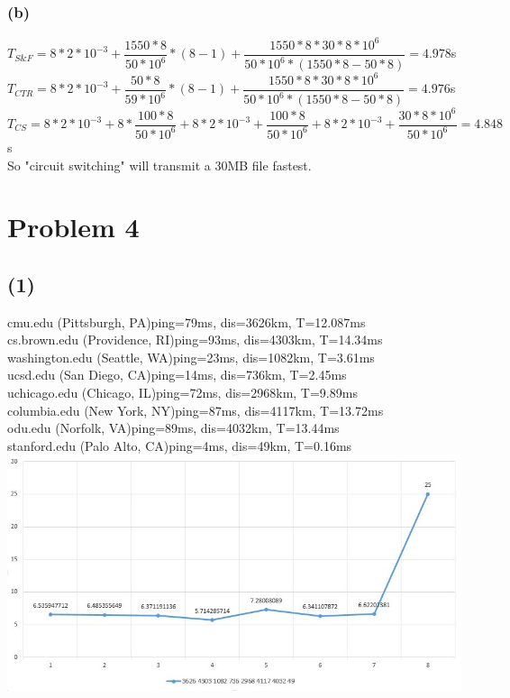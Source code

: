 \documentclass[11pt]{article}
\begin{document}
\subsubsection*{(b)}
$T_{S\&F}=8*2*10^{-3}+\dfrac{1550*8}{50*10^6}*(8-1)+\dfrac{1550*8*30*8*10^6}{50*10^6*(1550*8-50*8)}=4.978$s\\
$T_{CTR}=8*2*10^{-3}+\dfrac{50*8}{59*10^6}*(8-1)+\dfrac{1550*8*30*8*10^6}{50*10^6*(1550*8-50*8)}=4.976$s\\
$T_{CS}=8*2*10^{-3}+8*\dfrac{100*8}{50*10^6}+8*2*10^{-3}+\dfrac{100*8}{50*10^6}+8*2*10^{-3}+\dfrac{30*8*10^6}{50*10^6}=4.848$s\\
So "circuit switching" will transmit a 30MB ﬁle fastest.
\label{pg:end-of-p3}

%




\newpage

\section*{Problem 4}

\subsection*{(1)}
cmu.edu (Pittsburgh, PA)ping=79ms, dis=3626km, T=12.087ms\\
cs.brown.edu (Providence, RI)ping=93ms, dis=4303km, T=14.34ms\\
washington.edu (Seattle, WA)ping=23ms, dis=1082km, T=3.61ms\\
ucsd.edu (San Diego, CA)ping=14ms, dis=736km, T=2.45ms\\
uchicago.edu (Chicago, IL)ping=72ms, dis=2968km, T=9.89ms\\
columbia.edu (New York, NY)ping=87ms, dis=4117km, T=13.72ms\\
odu.edu (Norfolk, VA)ping=89ms, dis=4032km, T=13.44ms\\
stanford.edu (Palo Alto, CA)ping=4ms, dis=49km, T=0.16ms\\
\includegraphics[scale=0.5]{Capture.JPG}
\end{document}
